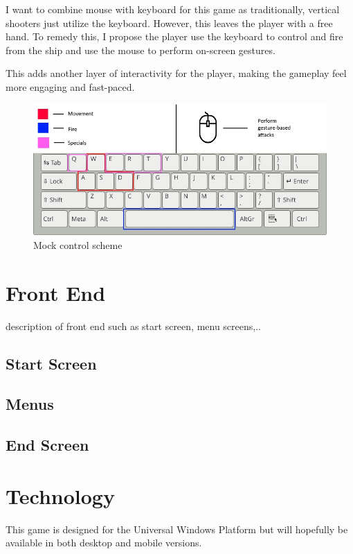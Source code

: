 \documentclass[a4paper]{scrreprt}
\begin{document}
I want to combine mouse with keyboard for this game as traditionally, vertical shooters just utilize the keyboard. However, this leaves the player with a free hand. To remedy this, I propose the player use the keyboard to control and fire from the ship and use the mouse to perform on-screen gestures.

This adds another layer of interactivity for the player, making the gameplay feel more engaging and fast-paced.

\begin{figure}[h]
  \centering
  \includegraphics[width=1\textwidth]{Controls}
  \caption{Mock control scheme}
  \end{figure}




\chapter{Front End}
description of front end such as start screen, menu screens,..  

\section{Start Screen}

\section{Menus}

\section{End Screen}



\chapter{Technology}
This game is designed for the Universal Windows Platform but will hopefully be available in both desktop and mobile versions.
\end{document}

